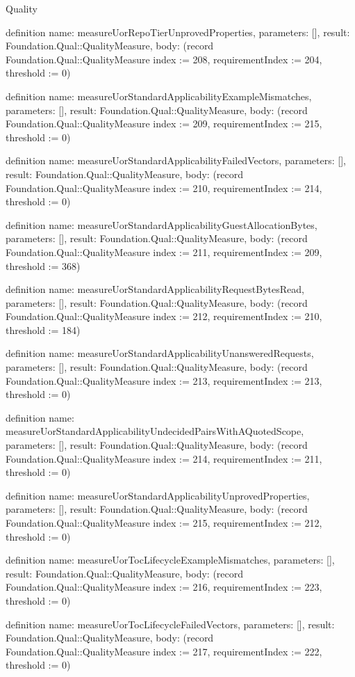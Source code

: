 \begin{lexlean}{Quality}
\begin{semanticmodule}
definition{
  name: measureUorRepoTierUnprovedProperties,
  parameters: [],
  result: Foundation.Qual::QualityMeasure,
  body: (record Foundation.Qual::QualityMeasure {index := 208, requirementIndex := 204, threshold := 0})
}

definition{
  name: measureUorStandardApplicabilityExampleMismatches,
  parameters: [],
  result: Foundation.Qual::QualityMeasure,
  body: (record Foundation.Qual::QualityMeasure {index := 209, requirementIndex := 215, threshold := 0})
}

definition{
  name: measureUorStandardApplicabilityFailedVectors,
  parameters: [],
  result: Foundation.Qual::QualityMeasure,
  body: (record Foundation.Qual::QualityMeasure {index := 210, requirementIndex := 214, threshold := 0})
}

definition{
  name: measureUorStandardApplicabilityGuestAllocationBytes,
  parameters: [],
  result: Foundation.Qual::QualityMeasure,
  body: (record Foundation.Qual::QualityMeasure {index := 211, requirementIndex := 209, threshold := 368})
}

definition{
  name: measureUorStandardApplicabilityRequestBytesRead,
  parameters: [],
  result: Foundation.Qual::QualityMeasure,
  body: (record Foundation.Qual::QualityMeasure {index := 212, requirementIndex := 210, threshold := 184})
}

definition{
  name: measureUorStandardApplicabilityUnansweredRequests,
  parameters: [],
  result: Foundation.Qual::QualityMeasure,
  body: (record Foundation.Qual::QualityMeasure {index := 213, requirementIndex := 213, threshold := 0})
}

definition{
  name: measureUorStandardApplicabilityUndecidedPairsWithAQuotedScope,
  parameters: [],
  result: Foundation.Qual::QualityMeasure,
  body: (record Foundation.Qual::QualityMeasure {index := 214, requirementIndex := 211, threshold := 0})
}

definition{
  name: measureUorStandardApplicabilityUnprovedProperties,
  parameters: [],
  result: Foundation.Qual::QualityMeasure,
  body: (record Foundation.Qual::QualityMeasure {index := 215, requirementIndex := 212, threshold := 0})
}

definition{
  name: measureUorTocLifecycleExampleMismatches,
  parameters: [],
  result: Foundation.Qual::QualityMeasure,
  body: (record Foundation.Qual::QualityMeasure {index := 216, requirementIndex := 223, threshold := 0})
}

definition{
  name: measureUorTocLifecycleFailedVectors,
  parameters: [],
  result: Foundation.Qual::QualityMeasure,
  body: (record Foundation.Qual::QualityMeasure {index := 217, requirementIndex := 222, threshold := 0})
}


\end{semanticmodule}
\end{lexlean}
